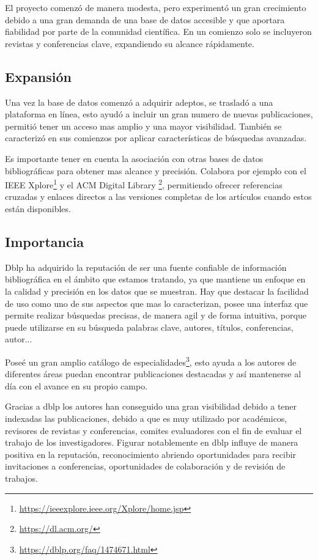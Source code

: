 \documentclass[a4paper, 12pt]{book}
\begin{document}
El proyecto comenzó de manera modesta, pero experimentó un gran crecimiento debido a una gran demanda de una base de datos accesible y que aportara fiabilidad por parte de la comunidad científica. En un comienzo solo se incluyeron revistas y conferencias clave, expandiendo su alcance rápidamente.

\subsection{Expansión}
Una vez la base de datos comenzó a adquirir adeptos, se trasladó a una plataforma en línea, esto ayudó a incluir un gran numero de nuevas publicaciones, permitió tener un acceso mas amplio y una mayor visibilidad. También se caracterizó en sus comienzos por aplicar características de búsquedas avanzadas.

Es importante tener en cuenta la asociación con otras bases de datos bibliográficas para obtener mas alcance y precisión. Colabora por ejemplo con el IEEE Xplore\footnote{\url{https://ieeexplore.ieee.org/Xplore/home.jsp}} y el ACM Digital Library \footnote{\url{https://dl.acm.org/}}, permitiendo ofrecer referencias cruzadas y enlaces directos a las versiones completas de los artículos cuando estos están disponibles.

\subsection{Importancia}
Dblp ha adquirido la reputación de ser una fuente confiable de información bibliográfica en el ámbito que estamos tratando, ya que mantiene un enfoque en la calidad y precisión en los datos que se muestran. 
Hay que destacar la facilidad de uso como uno de sus aspectos que mas lo caracterizan, posee una interfaz que permite realizar búsquedas precisas, de manera agil y de forma intuitiva, porque puede utilizarse en su búsqueda palabras clave, autores, títulos, conferencias, autor... 

Poseé un gran amplio catálogo de especialidades\footnote{\url{https://dblp.org/faq/1474671.html}}, esto ayuda a los autores de diferentes áreas puedan encontrar publicaciones destacadas y así mantenerse al día con el avance en su propio campo.

Gracias a dblp los autores han conseguido una gran visibilidad debido a tener indexadas las publicaciones, debido a que es muy utilizado por académicos, revisores de revistas y conferencias, comites evaluadores con el fin de evaluar el trabajo de los investigadores. Figurar notablemente en dblp influye de manera positiva en la reputación, reconocimiento abriendo oportunidades para recibir invitaciones a conferencias, oportunidades de colaboración y de revisión de trabajos.
\end{document}
